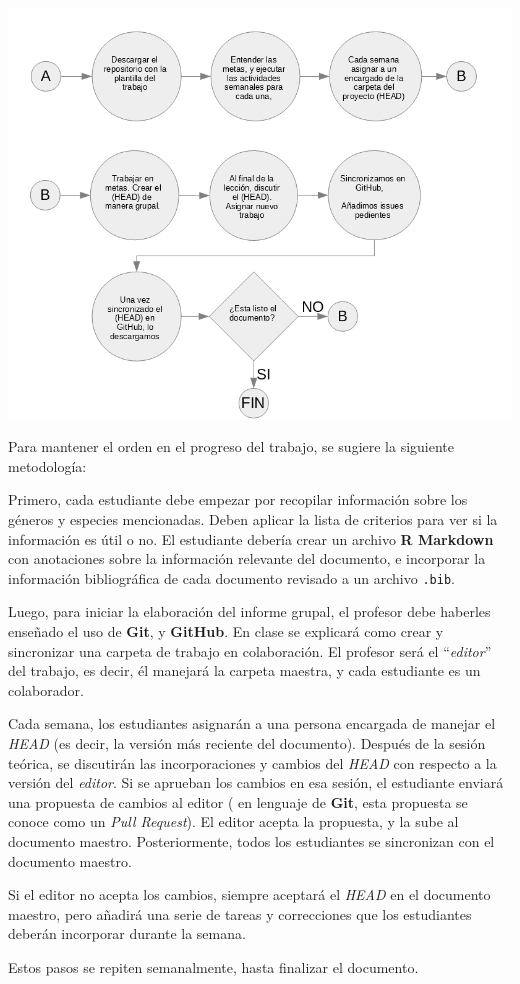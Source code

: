 \documentclass[12pt,letterpaper,]{book}
\begin{document}
\includegraphics{figuras/Flujo_Trabajo_grupal.png}

Para mantener el orden en el progreso del trabajo, se sugiere la
siguiente metodología:

Primero, cada estudiante debe empezar por recopilar información sobre
los géneros y especies mencionadas. Deben aplicar la lista de criterios
para ver si la información es útil o no. El estudiante debería crear un
archivo \textbf{R Markdown} con anotaciones sobre la información
relevante del documento, e incorporar la información bibliográfica de
cada documento revisado a un archivo \texttt{.bib}.

Luego, para iniciar la elaboración del informe grupal, el profesor debe
haberles enseñado el uso de \textbf{Git}, y \textbf{GitHub}. En clase se
explicará como crear y sincronizar una carpeta de trabajo en
colaboración. El profesor será el ``\emph{editor}'' del trabajo, es
decir, él manejará la carpeta maestra, y cada estudiante es un
colaborador.

Cada semana, los estudiantes asignarán a una persona encargada de
manejar el \emph{HEAD} (es decir, la versión más reciente del
documento). Después de la sesión teórica, se discutirán las
incorporaciones y cambios del \emph{HEAD} con respecto a la versión del
\emph{editor}. Si se aprueban los cambios en esa sesión, el estudiante
enviará una propuesta de cambios al editor ( en lenguaje de
\textbf{Git}, esta propuesta se conoce como un \emph{Pull Request}). El
editor acepta la propuesta, y la sube al documento maestro.
Posteriormente, todos los estudiantes se sincronizan con el documento
maestro.

Si el editor no acepta los cambios, siempre aceptará el \emph{HEAD} en
el documento maestro, pero añadirá una serie de tareas y correcciones
que los estudiantes deberán incorporar durante la semana.

Estos pasos se repiten semanalmente, hasta finalizar el documento.


\end{document}

